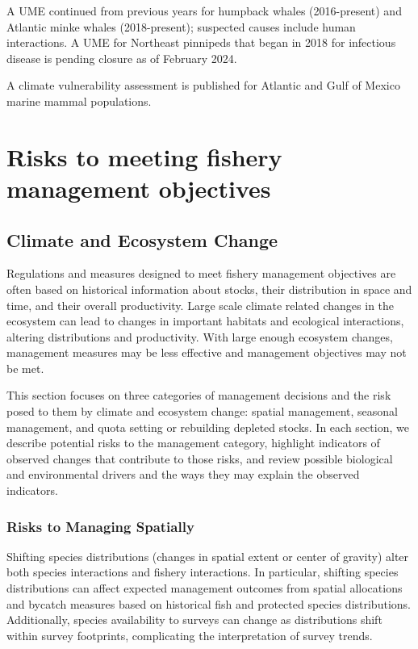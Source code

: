 \documentclass[
  10pt,
]{article}
\begin{document}
A UME continued from previous years for humpback whales (2016-present) and Atlantic minke whales (2018-present); suspected causes include human interactions. A UME for Northeast pinnipeds that began in 2018 for infectious disease is pending closure as of February 2024.

A climate vulnerability assessment is published for Atlantic and Gulf of Mexico marine mammal populations.

\hypertarget{climate-risks}{%
\section{Risks to meeting fishery management objectives}\label{climate-risks}}

\hypertarget{climate-and-ecosystem-change}{%
\subsection{Climate and Ecosystem Change}\label{climate-and-ecosystem-change}}

Regulations and measures designed to meet fishery management objectives are often based on historical information about stocks, their distribution in space and time, and their overall productivity. Large scale climate related changes in the ecosystem can lead to changes in important habitats and ecological interactions, altering distributions and productivity. With large enough ecosystem changes, management measures may be less effective and management objectives may not be met.

This section focuses on three categories of management decisions and the risk posed to them by climate and ecosystem change: spatial management, seasonal management, and quota setting or rebuilding depleted stocks. In each section, we describe potential risks to the management category, highlight indicators of observed changes that contribute to those risks, and review possible biological and environmental drivers and the ways they may explain the observed indicators.

\hypertarget{risks-to-managing-spatially}{%
\subsubsection{Risks to Managing Spatially}\label{risks-to-managing-spatially}}

Shifting species distributions (changes in spatial extent or center of gravity) alter both species interactions and fishery interactions. In particular, shifting species distributions can affect expected management outcomes from spatial allocations and bycatch measures based on historical fish and protected species distributions. Additionally, species availability to surveys can change as distributions shift within survey footprints, complicating the interpretation of survey trends.
\end{document}
